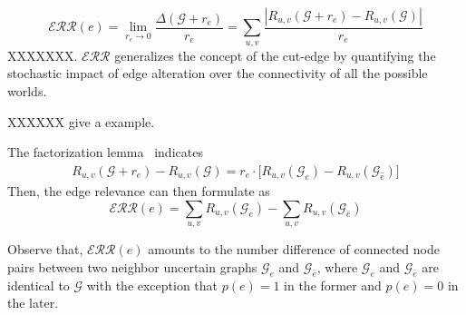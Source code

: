 \begin{equation*}
    \mathcal{ERR}({e}) = \lim_{r_{e} \rightarrow 0} \frac{\Delta(\mathcal{G}+r_{e})}{r_{e}} 
                      = \sum_{u,v} \frac{|R_{u,v}(\mathcal{G}+r_{e}) -R_{u,v}(\mathcal{G})|} {r_{e}}
\end{equation*}
XXXXXXX. 
$\mathcal{ERR}$ generalizes the concept of the cut-edge by quantifying the stochastic impact of edge alteration over the connectivity of all the possible worlds.  


XXXXXX give a example. 



The factorization lemma~\cite{Jin_Distance_2011} indicates
\begin{align*}
    R_{u,v}(\mathcal{G}+r_{e}) -R_{u,v}(\mathcal{G}) = r_{e} \cdot \big[ R_{u,v}(\mathcal{G}_{e})-R_{u,v}(\mathcal{G}_{\hat{e}}) \big]
\end{align*}
Then, the edge relevance can then formulate as
\begin{equation*}
    \mathcal{ERR}(e) = \sum_{u,v} R_{u,v}(\mathcal{G}_{e})  \big- \sum_{u,v} R_{u,v}(\mathcal{G}_{\bar{e}})
\end{equation*}

Observe that, $\mathcal{ERR}(e)$ amounts to the number difference of connected node pairs between two neighbor uncertain graphs $\mathcal{G}_{e}$ and $\mathcal{G}_{\bar{e}}$, 
where $\mathcal{G}_{e}$ and $\mathcal{G}_{\bar{e}}$ are identical to $\mathcal{G}$ with the exception that $p(e)=1$ in the former and $p(e)=0$ in the later. 














